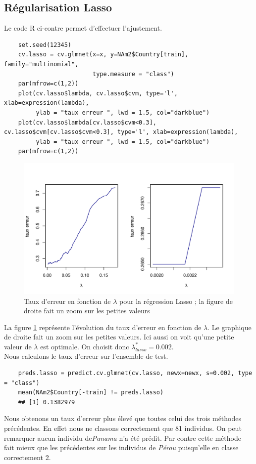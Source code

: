 \documentclass[12pt,a4paper]{article}
\begin{document}
\subsection{Régularisation Lasso}
Le code R ci-contre permet d'effectuer l'ajustement.
\begin{lstlisting}
	set.seed(12345)
	cv.lasso = cv.glmnet(x=x, y=NAm2$Country[train], family="multinomial",
	                     type.measure = "class")
	par(mfrow=c(1,2))
	plot(cv.lasso$lambda, cv.lasso$cvm, type='l', xlab=expression(lambda),
	     ylab = "taux erreur ", lwd = 1.5, col="darkblue")
	plot(cv.lasso$lambda[cv.lasso$cvm<0.3], cv.lasso$cvm[cv.lasso$cvm<0.3], type='l', xlab=expression(lambda),
	     ylab = "taux erreur ", lwd = 1.5, col="darkblue")
	par(mfrow=c(1,2))
\end{lstlisting}
\begin{figure}[h!]
	\begin{center}
		\includegraphics[scale=0.7]{figures/l_opt.pdf}
		\caption{Taux d'erreur en fonction de $\lambda$ pour la régression Lasso ; la figure de  droite fait un zoom sur les petites valeurs}
		\label{fig:l_opt}
	\end{center}
\end{figure}
La figure \ref{fig:l_opt} représente l'évolution du taux d'erreur en fonction
de $\lambda$. Le graphique de droite fait un zoom sur les petites valeurs. Ici
aussi on voit qu'une petite valeur de $\lambda$ est optimale. On choisit donc
$\lambda_{lasso}^* = 0.002$.\\
Nous calculons le taux d'erreur sur l'ensemble de test.

\begin{lstlisting}
	preds.lasso = predict.cv.glmnet(cv.lasso, newx=newx, s=0.002, type = "class")
	mean(NAm2$Country[-train] != preds.lasso)
	## [1] 0.1382979
\end{lstlisting}
Nous obtenons un taux d'erreur plus élevé que toutes celui des trois méthodes
précédentes. En effet nous ne classons correctement que 81 individus. On peut
remarquer aucun individu de\textit{Panama} n'a été prédit. Par contre cette
méthode fait mieux que les précédentes sur les individus de \textit{Pérou}
puisqu'elle en classe correctement 2.
\end{document}
